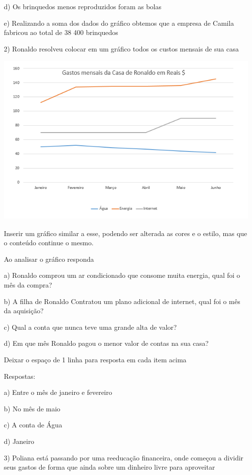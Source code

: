 d) Os brinquedos menos reproduzidos foram as bolas

e) Realizando a soma dos dados do gráfico obtemos que a empresa de
Camila fabricou ao total de 38 400 brinquedos

2) Ronaldo resolveu colocar em um gráfico todos os custos mensais de sua
casa

\includegraphics[width=5.30833in,height=3.41384in]{./imgSAEB_8_MAT/media/image40.png}

Inserir um gráfico similar a esse, podendo ser alterada as cores e o
estilo, mas que o conteúdo continue o mesmo.

Ao analisar o gráfico responda

a) Ronaldo comprou um ar condicionado que consome muita energia, qual
foi o mês da compra?

b) A filha de Ronaldo Contratou um plano adicional de internet, qual foi
o mês da aquisição?

c) Qual a conta que nunca teve uma grande alta de valor?

d) Em que mês Ronaldo pagou o menor valor de contas na sua casa?

Deixar o espaço de 1 linha para resposta em cada item acima

Respostas:

a) Entre o mês de janeiro e fevereiro

b) No mês de maio

c) A conta de Água

d) Janeiro

3) Poliana está passando por uma reeducação financeira, onde começou a
dividir seus gastos de forma que ainda sobre um dinheiro livre para
aproveitar


